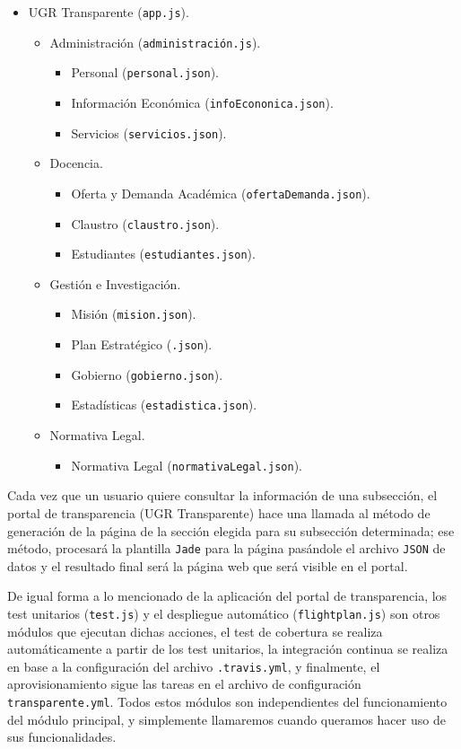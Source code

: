 \newpage
\begin{itemize}
 \item UGR Transparente ({\tt app.js}).
 \begin{itemize}
  \item Administración ({\tt administración.js}).
  \begin{itemize}
   \item Personal ({\tt personal.json}).
   \item Información Económica ({\tt infoEcononica.json}).
   \item Servicios ({\tt servicios.json}).
  \end{itemize}
  \item Docencia.
  \begin{itemize}
   \item Oferta y Demanda Académica ({\tt ofertaDemanda.json}).
   \item Claustro ({\tt claustro.json}).
   \item Estudiantes ({\tt estudiantes.json}).
  \end{itemize}
  \item Gestión e Investigación.
  \begin{itemize}
   \item Misión ({\tt mision.json}).
   \item Plan Estratégico ({\tt .json}).
   \item Gobierno ({\tt gobierno.json}).
   \item Estadísticas ({\tt estadistica.json}).
  \end{itemize}
  \item Normativa Legal.
  \begin{itemize}
   \item Normativa Legal ({\tt normativaLegal.json}).
  \end{itemize}
 \end{itemize}
\end{itemize}

Cada vez que un usuario quiere consultar la información de una subsección, el portal de transparencia (UGR Transparente) hace una llamada al método de generación de la página de la sección elegida para su subsección determinada; ese método, procesará la plantilla {\tt Jade} para la página pasándole el archivo {\tt JSON} de datos y el resultado final será la página web que será visible en el portal.

\bigskip
De igual forma a lo mencionado de la aplicación del portal de transparencia, los test unitarios ({\tt test.js}) y el despliegue automático ({\tt flightplan.js}) son otros módulos que ejecutan dichas acciones, el test de cobertura se realiza automáticamente a partir de los test unitarios, la integración continua se realiza en base a la configuración del archivo {\tt .travis.yml}, y finalmente, el aprovisionamiento sigue las tareas en el archivo de configuración {\tt transparente.yml}. Todos estos módulos son independientes del funcionamiento del módulo principal, y simplemente llamaremos cuando queramos hacer uso de sus funcionalidades.

